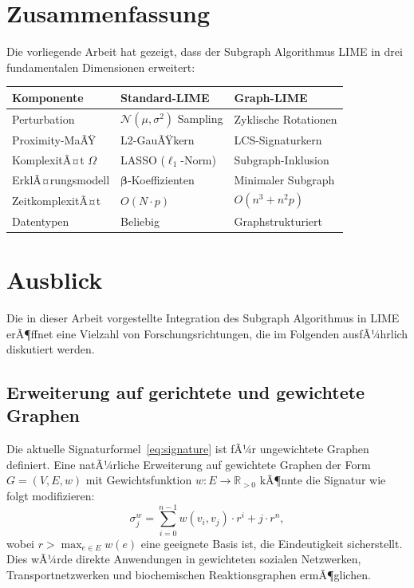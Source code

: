 ﻿\documentclass[a4paper,12pt]{article}
\theoremstyle{definition}
\begin{document}
\section{Zusammenfassung}

Die vorliegende Arbeit hat gezeigt, dass der Subgraph Algorithmus \citep{Epp2026}
LIME \citep{Ribeiro2016} in drei fundamentalen Dimensionen erweitert:

\begin{center}
\begin{tabular}{@{}lll@{}}
  \toprule
  Komponente & Standard-LIME & Graph-LIME \\
  \midrule
  Perturbation & $\mathcal{N}(\mu, \sigma^2)$ Sampling & Zyklische Rotationen \\
  Proximity-MaÃŸ & L2-GauÃŸkern & LCS-Signaturkern \\
  KomplexitÃ¤t $\Omega$ & LASSO ($\ell_1$-Norm) & Subgraph-Inklusion \\
  ErklÃ¤rungsmodell & $\boldsymbol{\beta}$-Koeffizienten & Minimaler Subgraph \\
  ZeitkomplexitÃ¤t & $O(N \cdot p)$ & $O(n^3 + n^2 p)$ \\
  Datentypen & Beliebig & Graphstrukturiert \\
  \bottomrule
\end{tabular}
\end{center}

\section{Ausblick}

Die in dieser Arbeit vorgestellte Integration des Subgraph Algorithmus in LIME
erÃ¶ffnet eine Vielzahl von Forschungsrichtungen, die im Folgenden ausfÃ¼hrlich
diskutiert werden.

\subsection{Erweiterung auf gerichtete und gewichtete Graphen}

Die aktuelle Signaturformel~\eqref{eq:signature} ist fÃ¼r ungewichtete Graphen
definiert. Eine natÃ¼rliche Erweiterung auf gewichtete Graphen der Form
$G = (V, E, w)$ mit Gewichtsfunktion $w: E \to \mathbb{R}_{>0}$ kÃ¶nnte
die Signatur wie folgt modifizieren:
\[
  \sigma_j^w = \sum_{i=0}^{n-1} w(v_i, v_j) \cdot r^i + j \cdot r^n,
\]
wobei $r > \max_{e \in E} w(e)$ eine geeignete Basis ist, die Eindeutigkeit
sicherstellt.
Dies wÃ¼rde direkte Anwendungen in gewichteten sozialen Netzwerken,
Transportnetzwerken und biochemischen Reaktionsgraphen ermÃ¶glichen.
\end{document}
